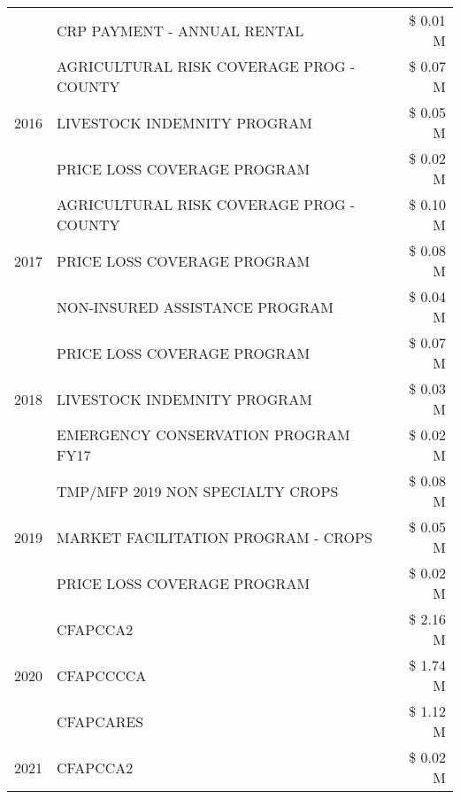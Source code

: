 \begin{tabular}{llr}
 & CRP PAYMENT - ANNUAL RENTAL & \$ 0.01 M \\
\cline{1-3}
\multirow[t]{3}{*}{2016} & AGRICULTURAL RISK COVERAGE PROG - COUNTY & \$ 0.07 M \\
 & LIVESTOCK INDEMNITY PROGRAM & \$ 0.05 M \\
 & PRICE LOSS COVERAGE PROGRAM & \$ 0.02 M \\
\cline{1-3}
\multirow[t]{3}{*}{2017} & AGRICULTURAL RISK COVERAGE PROG - COUNTY & \$ 0.10 M \\
 & PRICE LOSS COVERAGE PROGRAM & \$ 0.08 M \\
 & NON-INSURED ASSISTANCE PROGRAM & \$ 0.04 M \\
\cline{1-3}
\multirow[t]{3}{*}{2018} & PRICE LOSS COVERAGE PROGRAM & \$ 0.07 M \\
 & LIVESTOCK INDEMNITY PROGRAM & \$ 0.03 M \\
 & EMERGENCY CONSERVATION PROGRAM FY17 & \$ 0.02 M \\
\cline{1-3}
\multirow[t]{3}{*}{2019} & TMP/MFP 2019 NON SPECIALTY CROPS & \$ 0.08 M \\
 & MARKET FACILITATION PROGRAM - CROPS & \$ 0.05 M \\
 & PRICE LOSS COVERAGE PROGRAM & \$ 0.02 M \\
\cline{1-3}
\multirow[t]{3}{*}{2020} & CFAPCCA2 & \$ 2.16 M \\
 & CFAPCCCCA & \$ 1.74 M \\
 & CFAPCARES & \$ 1.12 M \\
\cline{1-3}
2021 & CFAPCCA2 & \$ 0.02 M \\
\cline{1-3}
\bottomrule
\end{tabular}
